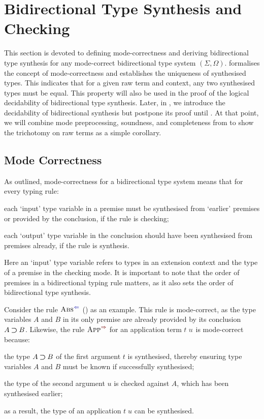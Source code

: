 
\section{Bidirectional Type Synthesis and Checking} \label{sec:type-synthesis}
This section is devoted to defining mode-correctness and deriving bidirectional type synthesis for any mode-correct bidirectional type system $(\Sigma, \Omega)$.
 formalises the concept of mode-correctness and establishes the uniqueness of synthesised types.
This indicates that for a given raw term and context, any two synthesised types must be equal.
This property will also be used in the proof of the logical decidability of bidirectional type synthesis.
Later, in , we introduce the decidability of bidirectional synthesis but postpone its proof until .
At that point, we will combine mode preprocessing, soundness, and completeness from  to show the trichotomy on raw terms as a simple corollary.

\subsection{Mode Correctness}\label{sec:mode-correctness}
As \citet{Dunfield2021} outlined, mode-correctness for a bidirectional type system means that for every typing rule:
\begin{enumerate*}
\item each `input' type variable in a premise must be synthesised from `earlier' premises or provided by the conclusion, if the rule is checking;
\item each `output' type variable in the conclusion should have been synthesised from premises already, if the rule is synthesis.
\end{enumerate*}
Here an `input' type variable refers to types in an extension context and the type of a premise in the checking mode.
It is important to note that the order of premises in a bidirectional typing rule matters, as it also sets the order of bidirectional type synthesis.

Consider the rule $\ChkRule{Abs}$ () as an example.
This rule is mode-correct, as the type variables $A$ and $B$ in its only premise are already provided by its conclusion $A \mathbin{\bm{\supset}} B$.
Likewise, the rule $\SynRule{App}$ for an application term $\isTerm{t\;u}$ is mode-correct because:
\begin{enumerate*}
\item the type $A \mathbin{\bm{\supset}} B$ of the first argument $t$ is synthesised, thereby ensuring type variables $A$ and $B$ must be known if successfully synthesised;
\item the type of the second argument $u$ is checked against $A$, which has been synthesised earlier;
\item as a result, the type of an application $t\;u$ can be synthesised.
\end{enumerate*}

